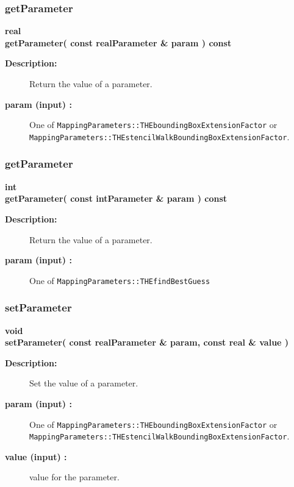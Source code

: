 \subsubsection{getParameter}
 
\begin{flushleft} \textbf{%
real  \\ 
\settowidth{\ApproximateGlobalInverseIncludeArgIndent}{getParameter(}%
getParameter( const  realParameter \& param ) const
}\end{flushleft}
\begin{description}
\item[{\bf Description:}] 
   Return the value of a parameter.
\item[{\bf param (input) :}]  One of {\tt MappingParameters::THEboundingBoxExtensionFactor}
     or {\tt MappingParameters::THEstencilWalkBoundingBoxExtensionFactor}.
 
\end{description}
\subsubsection{getParameter}
 
\begin{flushleft} \textbf{%
int  \\ 
\settowidth{\ApproximateGlobalInverseIncludeArgIndent}{getParameter(}%
getParameter( const  intParameter \& param ) const
}\end{flushleft}
\begin{description}
\item[{\bf Description:}] 
   Return the value of a parameter.
\item[{\bf param (input) :}]  One of {\tt MappingParameters::THEfindBestGuess}
 
\end{description}
\subsubsection{setParameter}
 
\begin{flushleft} \textbf{%
void  \\ 
\settowidth{\ApproximateGlobalInverseIncludeArgIndent}{setParameter(}%
setParameter( const  realParameter \& param, const real \& value ) 
}\end{flushleft}
\begin{description}
\item[{\bf Description:}] 
   Set the value of a parameter.
\item[{\bf param (input) :}]  One of {\tt MappingParameters::THEboundingBoxExtensionFactor}
     or {\tt MappingParameters::THEstencilWalkBoundingBoxExtensionFactor}.
\item[{\bf value (input) :}]  value for the parameter.
 
\end{description}

